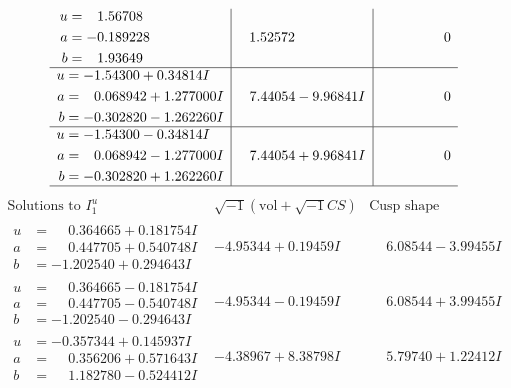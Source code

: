 \documentclass[1p]{elsarticle_modified}
\theoremstyle{definition}
\newcommand{\I}{\sqrt{-1}}
\begin{document}
$$\begin{array}{c|c|c}
\begin{aligned}
u &= \phantom{-}1.56708\phantom{ +0.000000I} \\
a &= -0.189228\phantom{ +0.000000I} \\
b &= \phantom{-}1.93649\phantom{ +0.000000I}\end{aligned}
 & \phantom{-}1.52572\phantom{ +0.000000I} & \phantom{-0.000000 } 0 \\ \hline\begin{aligned}
u &= -1.54300 + 0.34814 I \\
a &= \phantom{-}0.068942 + 1.277000 I \\
b &= -0.302820 - 1.262260 I\end{aligned}
 & \phantom{-}7.44054 - 9.96841 I & \phantom{-0.000000 } 0 \\ \hline\begin{aligned}
u &= -1.54300 - 0.34814 I \\
a &= \phantom{-}0.068942 - 1.277000 I \\
b &= -0.302820 + 1.262260 I\end{aligned}
 & \phantom{-}7.44054 + 9.96841 I & \phantom{-0.000000 } 0\\
 \hline 
 \end{array}$$\newpage$$\begin{array}{c|c|c}  
\text{Solutions to }I^u_{1}& \I (\text{vol} + \sqrt{-1}CS) & \text{Cusp shape}\\
 \hline 
\begin{aligned}
u &= \phantom{-}0.364665 + 0.181754 I \\
a &= \phantom{-}0.447705 + 0.540748 I \\
b &= -1.202540 + 0.294643 I\end{aligned}
 & -4.95344 + 0.19459 I & \phantom{-}6.08544 - 3.99455 I \\ \hline\begin{aligned}
u &= \phantom{-}0.364665 - 0.181754 I \\
a &= \phantom{-}0.447705 - 0.540748 I \\
b &= -1.202540 - 0.294643 I\end{aligned}
 & -4.95344 - 0.19459 I & \phantom{-}6.08544 + 3.99455 I \\ \hline\begin{aligned}
u &= -0.357344 + 0.145937 I \\
a &= \phantom{-}0.356206 + 0.571643 I \\
b &= \phantom{-}1.182780 - 0.524412 I\end{aligned}
 & -4.38967 + 8.38798 I & \phantom{-}5.79740 + 1.22412 I \\ \hline\begin{aligned}

\end{aligned}
\end{array}$$
\end{document}
